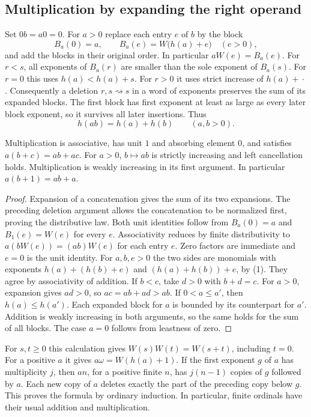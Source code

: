\subsection{Multiplication by expanding the right operand}
Set $0b=a0=0$. For $a>0$ replace each entry $e$ of $b$ by the block
\[
 B_a(0)=a,\qquad B_a(e)=W\bigl(h(a)+e\bigr)\quad(e>0),
\]
and add the blocks in their original order. In particular $aW(e)=B_a(e)$.
For $r<s$, all exponents of $B_a(r)$ are smaller than the sole exponent
of $B_a(s)$. For $r=0$ this uses $h(a)<h(a)+s$. For $r>0$ it uses strict
increase of $h(a)+{}\cdot$. Consequently a deletion $r,s\rightsquigarrow s$
in a word of exponents preserves the sum of its expanded blocks.
The first block has first exponent at least as large as every later
block exponent, so it survives all later insertions. Thus
\[
                  h(ab)=h(a)+h(b)\qquad(a,b>0).                 \tag{1}\label{eq:arith-head}
\]

\begin{theorem}\label{th:ordinary-mul}
Multiplication is associative, has unit $1$ and absorbing element $0$,
and satisfies $a(b+c)=ab+ac$. For $a>0$, $b\mapsto ab$ is strictly
increasing and left cancellation holds. Multiplication is weakly increasing
in its first argument. In particular $a(b+1)=ab+a$.
\end{theorem}
\begin{proof}
Expansion of a concatenation gives the sum of its two expansions.
The preceding deletion argument allows the concatenation to be normalized
first, proving the distributive law. Both unit identities follow from
$B_a(0)=a$ and $B_1(e)=W(e)$ for every $e$. Associativity reduces by
finite distributivity to $a(bW(e))=(ab)W(e)$ for each entry $e$.
Zero factors are immediate and $e=0$ is the unit identity.
For $a,b,e>0$ the two sides are monomials with exponents
$h(a)+(h(b)+e)$ and $(h(a)+h(b))+e$, by (1). They agree by associativity
of addition. If $b<c$, take $d>0$ with $b+d=c$. For $a>0$, expansion
gives $ad>0$, so $ac=ab+ad>ab$. If $0<a\le a'$, then $h(a)\le h(a')$. Each expanded block for $a$ is bounded by its counterpart for $a'$.
Addition is weakly increasing in both arguments, so the same holds for
the sum of all blocks. The case $a=0$ follows from leastness of zero.
\end{proof}

For $s,t\ge0$ this calculation gives
$W(s)W(t)=W(s+t)$, including $t=0$. For a positive $a$ it gives
$a\omega=W(h(a)+1)$. If the first exponent $g$ of $a$ has multiplicity
$j$, then $an$, for a positive finite $n$, has $j(n-1)$ copies of $g$
followed by $a$. Each new copy of $a$ deletes exactly the part of the
preceding copy below $g$. This proves the formula by ordinary induction.
In particular, finite ordinals have their usual addition and multiplication.

